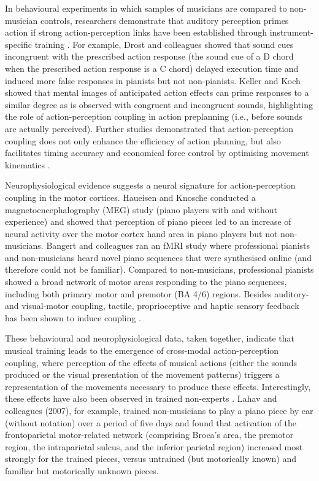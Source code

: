 \begin{CJK}{UTF8}{gbsn}
In behavioural experiments in which samples of musicians are compared to non-musician controls, researchers demonstrate that auditory perception primes action if strong action-perception links have been established through instrument-specific training \citep{Drost2005,Drost2005a,Drost2007}.  For example, Drost and colleagues showed that sound cues incongruent with the prescribed action response (the sound cue of a D chord when the prescribed action response is a C chord) delayed execution time \citep{Drost2005} and induced more false responses \citep[i.e., production of the heard chord, instead of the imperative one,][]{Drost2005a} in pianists but not non-pianists.  Keller and Koch \textcite{Keller2006} showed that mental images of anticipated action effects can prime responses to a similar degree as is observed with congruent and incongruent sounds, highlighting the role of action-perception coupling in action preplanning (i.e., before sounds are actually perceived).  Further studies demonstrated that action-perception coupling does not only enhance the efficiency of action planning, but also facilitates timing accuracy and economical force control by optimising movement kinematics \citep{Keller2010}.

Neurophysiological evidence suggests a neural signature for action-perception coupling in the motor cortices.  Haueisen and Knosche \citep{Haueisen2001} conducted a magnetoencephalography (MEG) study (piano players with and without experience) and showed that perception of piano pieces led to an increase of neural activity over the motor cortex hand area in piano players but not non-musicians.  Bangert and colleagues \textcite{Bangert2006} ran an fMRI study where professional pianists and non-musicians heard novel piano sequences that were synthesised online (and therefore could not be familiar).  Compared to non-musicians, professional pianists showed a broad network of motor areas responding to the piano sequences, including both primary motor and premotor (BA 4/6) regions.  Besides auditory- and visual-motor coupling, tactile, proprioceptive and haptic sensory feedback has been shown to induce coupling \citep{Schulz2003,Kuchenbuch2014}.

These behavioural and neurophysiological data, taken together, indicate that musical training leads to the emergence of cross-modal action-perception coupling, where perception of the effects of musical actions (either the sounds produced or the visual presentation of the movement patterns) triggers a representation of the movements necessary to produce these effects. Interestingly, these effects have also been observed in trained non-experts \citep{Bangert2003,Lahav2007}.  Lahav and colleagues (2007), for example, trained non-musicians to play a piano piece by ear (without notation) over a period of five days and found that activation of the frontoparietal motor-related network (comprising Broca’s area, the premotor region, the intraparietal sulcus, and the inferior parietal region) increased most strongly for the trained pieces, versus untrained (but motorically known) and familiar but motorically unknown pieces.


\end{CJK}
